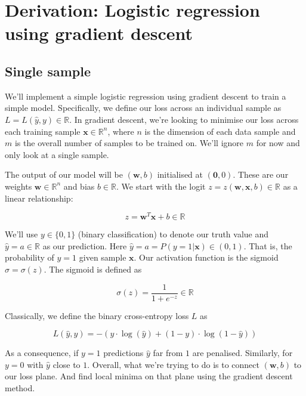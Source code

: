 \documentclass[varwidth,border=2cm]{standalone}
\begin{document}
\section{Derivation: Logistic regression using gradient descent}
\subsection{Single sample}
We'll implement a simple logistic regression using gradient descent to train a simple model. Specifically, we define our loss across an individual sample as $L=L(\hat{y},y) \in \mathbb{R}$. In gradient descent, we're looking to minimise our loss across each training sample $\bm x\in\mathbb{R}^{n}$, where $n$ is the dimension of each data sample and $m$ is the overall number of samples to be trained on. We'll ignore $m$ for now and only look at a single sample.

The output of our model will be $(\bm w,b)$ initialised at $(\bm 0, 0)$. These are our weights $\bm w\in\mathbb{R}^n$ and bias $b\in\mathbb{R}$. We start with the logit $z=z(\bm w,\bm x,b) \in \mathbb{R}$ as a linear relationship:

\begin{equation}
z=\bm w ^T\bm x + b \in \mathbb{R} \nonumber
\end{equation}

We'll use $y \in \{0,1\}$ (binary classification) to denote our truth value and $\hat{y} = a \in \mathbb{R}$ as our prediction. Here $\hat y = a = P(y=1|\bm x) \in (0, 1)$. That is, the probability of $y = 1$ given sample $\bm x$. Our activation function is the sigmoid $\sigma=\sigma(z)$. The sigmoid is defined as

\begin{equation}
\sigma(z) = \frac{1}{1 + e^{-z}} \in \mathbb{R} \nonumber
\end{equation}

Classically, we define the binary cross-entropy loss $L$ as

\begin{equation}
L(\hat y, y) = -\left(y \cdot \log(\hat y) + (1-y) \cdot \log(1-\hat y)\right) \nonumber
\end{equation}

As a consequence, if $y=1$ predictions $\hat y$ far from $1$ are penalised. Similarly, for $y=0$ with $\hat y$ close to $1$. Overall, what we're trying to do is to connect $(\bm w, b)$ to our loss plane. And find local minima on that plane using the gradient descent method.
\end{document}
